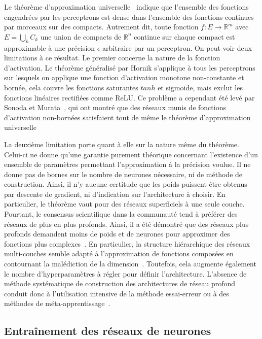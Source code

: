 Le théorème d'approximation universelle~\cite{cybenko_approximation_1989,hornik_approximation_1991} indique que l'ensemble des fonctions engendrées par les perceptrons est dense dans l'ensemble des fonctions continues par morceaux sur des compacts. Autrement dit, toute fonction $f : E \rightarrow \mathbb{R}^m$ avec $E = \bigcup\limits_{k} C_k$ une union de compacts de $\mathbb{R}^n$ continue sur chaque compact est approximable à une précision $\epsilon$ arbitraire par un perceptron. On peut voir deux limitations à ce résultat. Le premier concerne la nature de la fonction d'activation. Le théorème généralisé par Hornik s'applique à tous les perceptrons sur lesquels on applique une fonction d'activation monotone non-constante et bornée, cela couvre les fonctions saturantes $tanh$ et sigmoide, mais exclut les fonctions linéaires rectifiées comme \gls{ReLU}. Ce problème a cependant été levé par Sonoda et Murata~\cite{sonoda_neural_2017}, qui ont montré que des réseaux munis de fonctions d'activation non-bornées satisfaient tout de même le théorème d'approximation universelle


La deuxième limitation porte quant à elle sur la nature même du théorème. Celui-ci ne donne qu'une garantie purement théorique concernant l'existence d'un ensemble de paramètres permettant l'approximation à la précision voulue. Il ne donne pas de bornes sur le nombre de neurones nécessaire, ni de méthode de construction. Ainsi, il n'y aucune certitude que les poids puissent être obtenus par descente de gradient, ni d'indication sur l'architecture à choisir. En particulier, le théorème vaut pour des réseaux superficiels à une seule couche. Pourtant, le consensus scientifique dans la communauté tend à préférer des réseaux de plus en plus profonds. Ainsi, il a été démontré que des réseaux plus profonds demandent moins de poids et de neurones pour approximer des fonctions plus complexes~\cite{bianchini_complexity_2014,mhaskar_when_2017}. En particulier, la structure hiérarchique des réseaux multi-couches semble adapté à l'approximation de fonctions composées en contournant la malédiction de la dimension~\cite{poggio_why_2017}. Toutefois, cela augmente également le nombre d'hyperparamètres à régler pour définir l'architecture. L'absence de méthode systématique de construction des architectures de réseau profond conduit donc à l'utilisation intensive de la méthode essai-erreur ou à des méthodes de méta-apprentissage~\cite{zoph_neural_2016}.

\subsection{Entraînement des réseaux de neurones}

